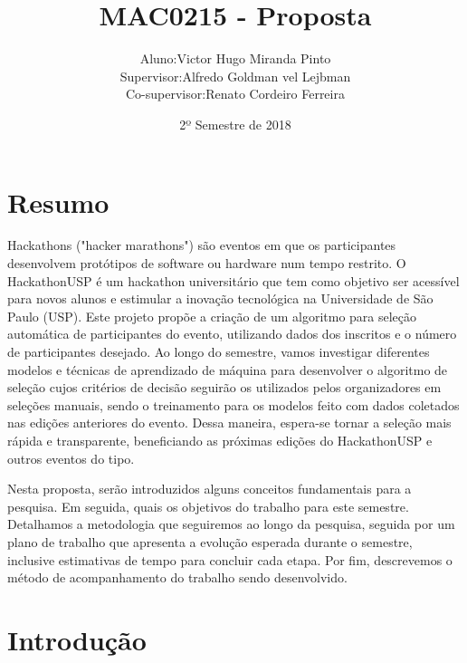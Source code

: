 \documentclass[10pt,twoside,a4paper]{article}
\title{MAC0215 - Proposta}
\author{
  \begin{tabular}{rl}
    Aluno:      & Victor Hugo Miranda Pinto \\
    Supervisor: & Alfredo Goldman vel Lejbman \\
    Co-supervisor: & Renato Cordeiro Ferreira
  \end{tabular}
}
\date{2º Semestre de 2018}
\begin{document}
\onehalfspacing

\maketitle

\section{Resumo}
  Hackathons ("hacker marathons") são eventos em que os participantes desenvolvem protótipos de software ou hardware num tempo restrito. O HackathonUSP é um hackathon universitário que tem como objetivo ser acessível para novos alunos e estimular a inovação tecnológica na Universidade de São Paulo (USP). Este projeto propõe a criação de um algoritmo para seleção automática de participantes do evento, utilizando dados dos inscritos e o número de participantes desejado. Ao longo do semestre, vamos investigar diferentes modelos e técnicas de aprendizado de máquina para desenvolver o algoritmo de seleção cujos critérios de decisão seguirão os utilizados pelos organizadores em seleções manuais, sendo o treinamento para os modelos feito com dados coletados nas edições anteriores do evento. Dessa maneira, espera-se tornar a seleção mais rápida e transparente, beneficiando as próximas edições do HackathonUSP e outros eventos do tipo.
  
  Nesta proposta, serão introduzidos alguns conceitos fundamentais para a pesquisa. Em seguida, quais os objetivos do trabalho para este semestre. Detalhamos a metodologia que seguiremos ao longo da pesquisa, seguida por um plano de trabalho que apresenta a evolução esperada durante o semestre, inclusive estimativas de tempo para concluir cada etapa. Por fim, descrevemos o método de acompanhamento do trabalho sendo desenvolvido.
  

\section{Introdução}
\end{document}
